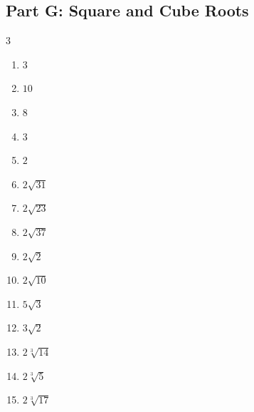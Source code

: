 \documentclass[11pt]{article}
\begin{document}
\subsection*{Part G: Square and Cube Roots}
\begin{multicols}{3}
\begin{enumerate}
  \item $3$
  \item $10$
  \item $8$
  \item $3$
  \item $2$
  \item $2 \sqrt{31}$
  \item $2 \sqrt{23}$
  \item $2 \sqrt{37}$
  \item $2 \sqrt{2}$
  \item $2 \sqrt{10}$
  \item $5 \sqrt{3}$
  \item $3 \sqrt{2}$
  \item $2 \sqrt[3]{14}$
  \item $2 \sqrt[3]{5}$
  \item $2 \sqrt[3]{17}$
\end{enumerate}
\end{multicols}
\end{document}
